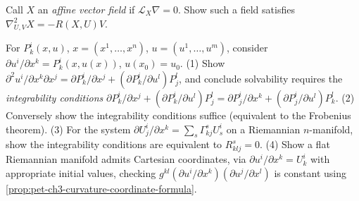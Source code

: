 \begin{remark}
  \label{rem:pet-ch3-ex-19}


  Call $X$ an \emph{affine vector field} if $\mathcal L_X\nabla=0$. Show such a
  field satisfies $\nabla^2_{U,V}X=-R(X,U)V$.
\end{remark}

\begin{remark}
  \label{rem:pet-ch3-ex-20}


  For $P^i_k(x,u)$, $x=(x^1,\dots,x^n)$, $u=(u^1,\dots,u^m)$, consider
  $\partial u^i/\partial x^k=P^i_k(x,u(x))$, $u(x_0)=u_0$. (1) Show
  $\partial^2u^i/\partial x^k\partial x^j=\partial P^i_k/\partial
  x^j+(\partial P^i_k/\partial u^l)P^l_j$, and conclude solvability requires the
  \emph{integrability conditions}
  $\partial P^i_k/\partial x^j+(\partial P^i_k/\partial u^l)P^l_j=\partial
  P^i_j/\partial x^k+(\partial P^i_j/\partial u^l)P^l_k$. (2) Conversely show
  the integrability conditions suffice (equivalent to the Frobenius theorem). (3)
  For the system $\partial U^i_j/\partial x^k=\sum_s\Gamma^s_{kj}U^i_s$ on a
  Riemannian $n$-manifold, show the integrability conditions are equivalent to
  $R^s_{klj}=0$. (4) Show a flat Riemannian manifold admits Cartesian
  coordinates, via $\partial u^i/\partial x^k=U^i_k$ with appropriate initial
  values, checking $g^{kl}(\partial u^i/\partial x^k)(\partial u^j/\partial x^l)$
  is constant using \cref{prop:pet-ch3-curvature-coordinate-formula}.
\end{remark}

